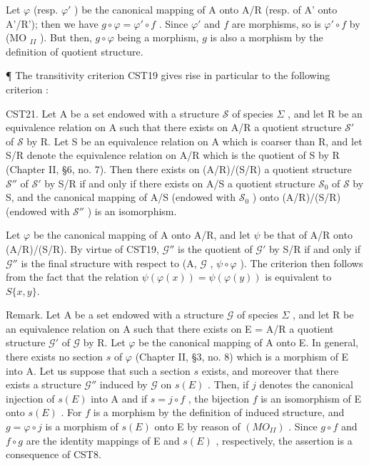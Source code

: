 Let \(\varphi\) (resp. \(\varphi'\) ) be the canonical mapping of A onto A/R (resp. of A' onto A'/R'); then we have \(g \circ \varphi = \varphi' \circ f\) . Since \(\varphi'\) and \(f\) are morphisms, so is \(\varphi' \circ f\) by (MO \(_{II}\) ). But then, \(g \circ \varphi\) being a morphism, \(g\) is also a morphism by the definition of quotient structure.

¶ The transitivity criterion CST19 gives rise in particular to the following criterion :

CST21. Let A be a set endowed with a structure \(\mathcal{S}\) of species \(\Sigma\) , and let R be an equivalence relation on A such that there exists on A/R a quotient structure \(\mathcal{S}'\) of \(\mathcal{S}\) by R. Let S be an equivalence relation on A which is coarser than R, and let S/R denote the equivalence relation on A/R which is the quotient of S by R (Chapter II, §6, no. 7). Then there exists on (A/R)/(S/R) a quotient structure \(\mathcal{S}''\) of \(\mathcal{S}'\) by S/R if and only if there exists on A/S a quotient structure \(\mathcal{S}_0\) of \(\mathcal{S}\) by S, and the canonical mapping of A/S (endowed with \(\mathcal{S}_0\) ) onto (A/R)/(S/R) (endowed with \(\mathcal{S}''\) ) is an isomorphism.

Let \(\varphi\) be the canonical mapping of A onto A/R, and let \(\psi\) be that of A/R onto (A/R)/(S/R). By virtue of CST19, \(\mathcal{G}''\) is the quotient of \(\mathcal{G}'\) by S/R if and only if \(\mathcal{G}''\) is the final structure with respect to (A, \(\mathcal{G}\) , \(\psi \circ \varphi\) ). The criterion then follows from the fact that the relation \(\psi(\varphi(x)) = \psi(\varphi(y))\) is equivalent to \(S\{x,y\}\).

Remark. Let A be a set endowed with a structure \(\mathcal{G}\) of species \(\Sigma\) , and let R be an equivalence relation on A such that there exists on E = A/R a quotient structure \(\mathcal{G}'\) of \(\mathcal{G}\) by R. Let \(\varphi\) be the canonical mapping of A onto E. In general, there exists no section \(s\) of \(\varphi\) (Chapter II, §3, no. 8) which is a morphism of E into A. Let us suppose that such a section \(s\) exists, and moreover that there exists a structure \(\mathcal{G}''\) induced by \(\mathcal{G}\) on \(s(E)\) . Then, if \(j\) denotes the canonical injection of \(s(E)\) into A and if \(s = j \circ f\) , the bijection \(f\) is an isomorphism of E onto \(s(E)\) . For \(f\) is a morphism by the definition of induced structure, and \(g = \varphi \circ j\) is a morphism of \(s(E)\) onto E by reason of \((MO_{II})\) . Since \(g \circ f\) and \(f \circ g\) are the identity mappings of E and \(s(E)\) , respectively, the assertion is a consequence of CST8.

